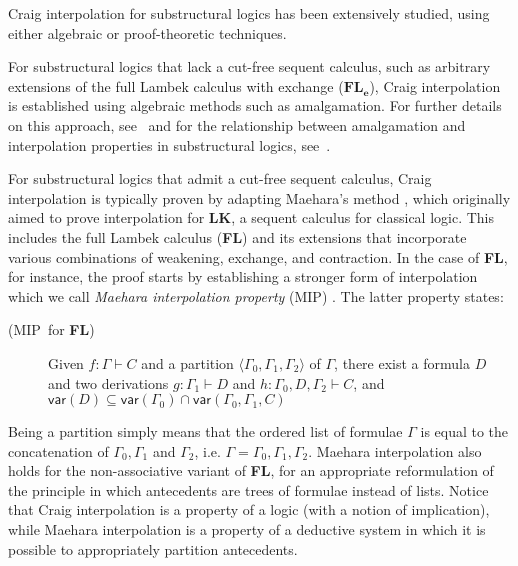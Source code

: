 \documentclass[sn-mathphys-num]{sn-jnl}%
\newcommand{\GG}{\Gamma}
\newcommand{\mf}[1]{\mathsf{#1}}
\newcommand{\gs}[1]{\sigma_{X} (#1)}
\newcommand{\vars}[1]{\mf{var} (#1)}
\newcommand{\FL}{\textbf{FL}}
\newcommand{\MIP}{\textsf{MIP}}
\newcommand{\niccolo}[1]{\textcolor{red}{NV: #1}}
\theoremstyle{thmstyleone}%
\theoremstyle{thmstyletwo}%
\theoremstyle{thmstylethree}%
\begin{document}
Craig interpolation for substructural logics has been extensively studied, using either algebraic or proof-theoretic techniques. 

For substructural logics that lack a cut-free sequent calculus, such as arbitrary extensions of the full Lambek calculus with exchange ($\FL_{\textbf{e}}$), Craig interpolation is established using algebraic methods such as amalgamation.
For further details on this approach, see~\cite{Fussner2024} and for the relationship between amalgamation and interpolation properties in substructural logics, see~\cite{Kihara2009}.

For substructural logics that admit a cut-free sequent calculus, Craig interpolation is typically proven by adapting Maehara's method \cite{maehara1961}, which originally aimed to prove interpolation for $\mathbf{LK}$, a sequent calculus for classical logic.
This includes the full Lambek calculus (\FL) and its extensions that incorporate various combinations of weakening, exchange, and contraction.
In the case of \FL, for instance, the proof starts by establishing a stronger form of interpolation which we call \emph{Maehara interpolation property} (\MIP) \cite{ono:proof:nonclassical:1998}. 
The latter property states:
\begin{description}
  \item[(\MIP~for \FL)] Given $f : \GG \vdash C$ and a partition $\langle \GG_0, \GG_1, \GG_2 \rangle$ of $\GG$, there exist a formula $D$ and two derivations $g : \GG_1 \vdash D$ and $h : \GG_0, D, \GG_2 \vdash C$, and $\vars{D} \subseteq \vars{\GG_0} \cap \vars{\GG_0, \GG_1, C}$
\end{description}
Being a partition simply means that the ordered list of formulae $\GG$ is equal to the concatenation of $\GG_0, \GG_1$ and $\GG_2$, i.e. $\GG = \GG_0, \GG_1, \GG_2$. 
Maehara interpolation also holds for the non-associative variant of \FL, for an appropriate reformulation of the principle in which antecedents are trees of formulae instead of lists.
Notice that Craig interpolation is a property of a logic (with a notion of implication), while Maehara interpolation is a property of a deductive system in which it is possible to appropriately partition antecedents.
\end{document}
